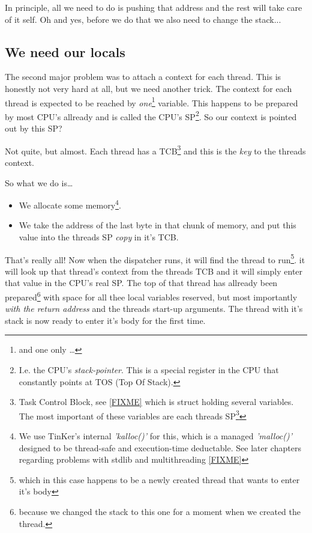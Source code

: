 {		In principle, all we need to do is pushing that address and the rest will take care of it self. Oh and yes, before we do that we also need to change the stack...

	\subsection{We need our locals}
		The second major problem was to attach a context for each thread. This is honestly not very hard at all, but we need another trick. The context for each thread is expected to be reached by \textit{one}\footnote{and one only \ldots} variable. This happens to be prepared by most CPU's allready and is called the CPU's SP\footnote{I.e. the CPU's \textit{stack-pointer}. This is a special register in the CPU that constantly points at TOS (Top Of Stack).}. So our context is pointed out by this SP?

		Not quite, but almost. Each thread has a TCB\footnote{Task Control Block, see \ref{FIXME} which is struct holding several variables. The most important of these variables are each threads SP\footnote{Actually, a copy of each threads SP as it were just before it got blocked. The real SP belongs to the CPU and there can only be one\ldots}} and this is the \textit{key} to the threads context.

		So what we do is\ldots 
		\begin{itemize}
			\item We allocate some memory\footnote{We use TinKer's internal \textit{'kalloc()'} for this, which is a managed \textit{'malloc()'} designed to be thread-safe and execution-time deductable. See later chapters regarding problems with stdlib and multithreading \ref{FIXME}}.
			\item We take the address of the last byte in that chunk of memory, and put this value into the threads SP \textit{copy} in it's TCB.
		\end{itemize}
		That's really all! Now when the dispatcher runs, it will find the thread to run\footnote{which in this case happens to be a newly created thread that wants to enter it's body}. it will look up that thread's context from the threads TCB and it will simply enter that value in the CPU's real SP. The top of that thread has allready been prepared\footnote{because we changed the stack to this one for a moment when we created the thread.} with space for all thee local variables reserved, but most importantly \textit{with the return address} and the threads start-up arguments. The thread with it's stack is now ready to enter it's body for the first time.

}
